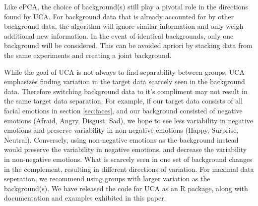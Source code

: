 \documentclass[12pt]{article}
\begin{document}
Like cPCA, the choice of background(s) still play a pivotal role in the directions found by UCA.
For background data that is already accounted for by other background data, the algorithm will ignore similar information and only weigh additional new information. In the event of identical backgrounds, only one background will be considered.
This can be avoided apriori by stacking data from the same experiments and creating a joint background. 

While the goal of UCA is not always to find separability between groups, UCA emphasizes finding variation in the target data scarcely seen in the background data. Therefore switching background data to it's compliment may not result in the same target data separation. 
For example, if our target data consists of all facial emotions in section \ref{sec:faces}, and our background consisted of negative emotions (Afraid, Angry, Disgust, Sad), we hope to see less variability in negative emotions and preserve variability in non-negative emotions (Happy, Surprise, Neutral).
Conversely, using non-negative emotions as the background instead would preserve the variability in negative emotions, and decrease the variability in non-negative emotions. What is scarcely seen in one set of background changes in the complement, resulting in different directions of variation. 
For maximal data seperation, we recommend using groups with larger variation as the background(s).
We have released the code for UCA as an R package, along with documentation and examples exhibited in this paper. 
\end{document}
